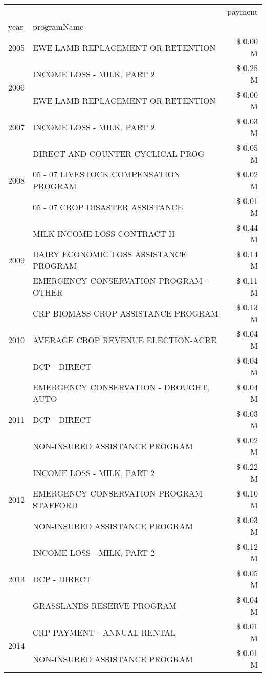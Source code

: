\begin{tabular}{llr}
\toprule
 &  & payment \\
year & programName &  \\
\midrule
2005 & EWE LAMB REPLACEMENT OR RETENTION & \$ 0.00 M \\
\cline{1-3}
\multirow[t]{2}{*}{2006} & INCOME LOSS - MILK, PART 2 & \$ 0.25 M \\
 & EWE LAMB REPLACEMENT OR RETENTION & \$ 0.00 M \\
\cline{1-3}
2007 & INCOME LOSS - MILK, PART 2 & \$ 0.03 M \\
\cline{1-3}
\multirow[t]{3}{*}{2008} & DIRECT AND COUNTER CYCLICAL PROG & \$ 0.05 M \\
 & 05 - 07 LIVESTOCK COMPENSATION PROGRAM & \$ 0.02 M \\
 & 05 - 07 CROP DISASTER ASSISTANCE & \$ 0.01 M \\
\cline{1-3}
\multirow[t]{3}{*}{2009} & MILK INCOME LOSS CONTRACT II & \$ 0.44 M \\
 & DAIRY ECONOMIC LOSS ASSISTANCE PROGRAM & \$ 0.14 M \\
 & EMERGENCY CONSERVATION PROGRAM - OTHER & \$ 0.11 M \\
\cline{1-3}
\multirow[t]{3}{*}{2010} & CRP BIOMASS CROP ASSISTANCE PROGRAM & \$ 0.13 M \\
 & AVERAGE CROP REVENUE ELECTION-ACRE & \$ 0.04 M \\
 & DCP - DIRECT & \$ 0.04 M \\
\cline{1-3}
\multirow[t]{3}{*}{2011} & EMERGENCY CONSERVATION - DROUGHT, AUTO & \$ 0.04 M \\
 & DCP - DIRECT & \$ 0.03 M \\
 & NON-INSURED ASSISTANCE PROGRAM & \$ 0.02 M \\
\cline{1-3}
\multirow[t]{3}{*}{2012} & INCOME LOSS - MILK, PART 2 & \$ 0.22 M \\
 & EMERGENCY CONSERVATION PROGRAM STAFFORD & \$ 0.10 M \\
 & NON-INSURED ASSISTANCE PROGRAM & \$ 0.03 M \\
\cline{1-3}
\multirow[t]{3}{*}{2013} & INCOME LOSS - MILK, PART 2 & \$ 0.12 M \\
 & DCP - DIRECT & \$ 0.05 M \\
 & GRASSLANDS RESERVE PROGRAM & \$ 0.04 M \\
\cline{1-3}
\multirow[t]{3}{*}{2014} & CRP PAYMENT - ANNUAL RENTAL & \$ 0.01 M \\
 & NON-INSURED ASSISTANCE PROGRAM & \$ 0.01 M \\

\end{tabular}

